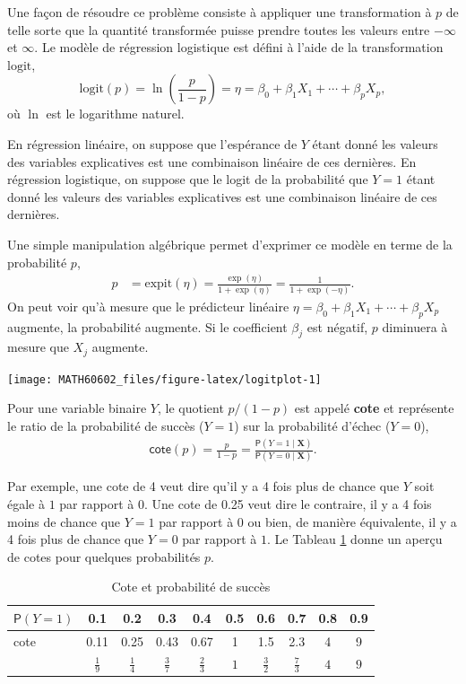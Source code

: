 \documentclass[
  11pt,
  letterpaper,
]{book}
\theoremstyle{definition}
\theoremstyle{definition}
\theoremstyle{definition}
\theoremstyle{definition}
\theoremstyle{remark}
\begin{document}
Une façon de résoudre ce problème consiste à appliquer une transformation à \(p\) de telle sorte que la quantité transformée puisse prendre toutes les valeurs entre \(-\infty\) et \(\infty\).
Le modèle de régression logistique est défini à l'aide de la transformation \(\mathrm{logit}\),
\[\mathrm{logit}(p) = \ln\left( \frac{p}{1-p}\right)=\eta=\beta_0 + \beta_1X_1 + \cdots + \beta_p X_p,\]
où \(\ln\) est le logarithme naturel.

En régression linéaire, on suppose que l'espérance de \(Y\) étant donné les valeurs des variables explicatives est une combinaison linéaire de ces dernières. En régression logistique, on suppose que le logit de la probabilité que \(Y=1\) étant donné les valeurs des variables explicatives est une combinaison linéaire de ces dernières.

Une simple manipulation algébrique permet d'exprimer ce modèle en terme de la probabilité \(p\),
\begin{align*}
 p &= \mathrm{expit}(\eta) = \frac{\exp(\eta)}{1+\exp(\eta)}
= \frac{1}{1+\exp(-\eta)}.
\end{align*}
On peut voir qu'à mesure que le prédicteur linéaire \(\eta=\beta_0+\beta_1X_1 + \cdots + \beta_pX_p\) augmente, la probabilité augmente.
Si le coefficient \(\beta_j\) est négatif, \(p\) diminuera à mesure que \(X_j\) augmente.

\begin{center}\texttt{[image: MATH60602\_files/figure-latex/logitplot-1]} \end{center}

Pour une variable binaire \(Y\), le quotient \(p/(1-p)\) est appelé \textbf{cote} et représente le ratio de la probabilité de succès (\(Y=1\)) sur la probabilité d'échec (\(Y=0\)),
\begin{align*}
 \mathsf{cote}(p) = \frac{p}{1-p} = \frac{{\mathsf P}\left(Y=1 \mid \boldsymbol{X}\right)}{{\mathsf P}\left(Y=0 \mid \boldsymbol{X}\right)}.
\end{align*}

Par exemple, une cote de 4 veut dire qu'il y a 4 fois plus de chance que \(Y\) soit égale à \(1\) par rapport à \(0\). Une cote de 0.25 veut dire le contraire, il y a 4 fois moins de chance que \(Y=1\) par rapport à \(0\) ou bien, de manière équivalente, il y a 4 fois plus de chance que \(Y=0\) par rapport à \(1\). Le Tableau \ref{tab:03-cotes} donne un aperçu de cotes pour quelques probabilités \(p\).

\begin{table}

\caption{\label{tab:03-cotes}Cote et probabilité de succès}
\centering
\begin{tabular}[t]{lccccccccc}
\toprule
${\mathsf P}\left(Y=1\right)$ & 0.1 & 0.2 & 0.3 & 0.4 & 0.5 & 0.6 & 0.7 & 0.8 & 0.9\\
\midrule
cote & 0.11 & 0.25 & 0.43 & 0.67 & 1 & 1.5 & 2.3 & 4 & 9\\
 & $\frac{1}{9}$ & $\frac{1}{4}$ & $\frac{3}{7}$ & $\frac{2}{3}$ & $1$ & $\frac{3}{2}$ & $\frac{7}{3}$ & $4$ & $9$\\
\bottomrule
\end{tabular}
\end{table}
\end{document}
